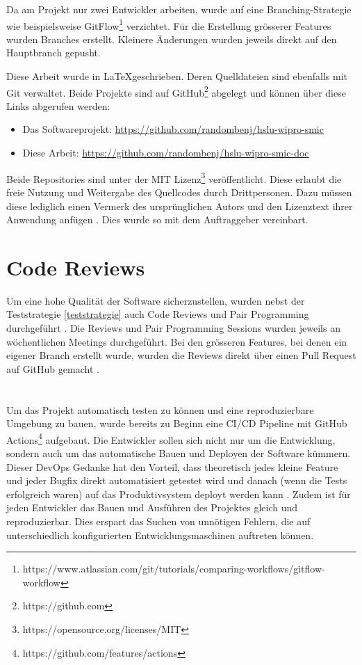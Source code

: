 Da am Projekt nur zwei Entwickler arbeiten,
wurde auf eine Branching-Strategie wie beispielsweise
GitFlow\footnote{https://www.atlassian.com/git/tutorials/comparing-workflows/gitflow-workflow} verzichtet.
Für die Erstellung grösserer Features wurden Branches erstellt.
Kleinere Änderungen wurden jeweils direkt auf den Hauptbranch gepusht.

Diese Arbeit wurde in \LaTeX geschrieben. Deren Quelldateien sind ebenfalls mit Git verwaltet.
Beide Projekte sind auf GitHub\footnote{https://github.com} abgelegt und können über diese Links abgerufen werden:

\begin{itemize}
      \item Das Softwareprojekt: \url{https://github.com/randombenj/hslu-wipro-smic}
      \item Diese Arbeit: \url{https://github.com/randombenj/hslu-wipro-smic-doc}
\end{itemize}

Beide Repositories sind unter der MIT Lizenz\footnote{https://opensource.org/licenses/MIT} veröffentlicht.
Diese erlaubt die freie Nutzung und Weitergabe des Quellcodes durch Drittpersonen.
Dazu müssen diese lediglich einen Vermerk des ursprünglichen Autors und den Lizenztext ihrer Anwendung anfügen \parencite{mit_licence}.
Dies wurde so mit dem Auftraggeber vereinbart.

\section{Code Reviews}

Um eine hohe Qualität der Software sicherzustellen, wurden nebst der Teststrategie \ref{teststrategie}
auch Code Reviews und Pair Programming durchgeführt \parencite{fu2017code}.
Die Reviews und Pair Programming Sessions wurden jeweils an wöchentlichen
Meetings durchgeführt.
Bei den grösseren Features, bei denen ein eigener Branch erstellt wurde, wurden die
Reviews direkt über einen Pull Request auf GitHub gemacht \parencite{github_flow_docs_2021}.

\section{}

Um das Projekt automatisch testen zu können und eine reproduzierbare Umgebung zu bauen,
wurde bereits zu Beginn eine \ac{CI/CD} Pipeline mit GitHub Actions\footnote{https://github.com/features/actions}
aufgebaut.
Die Entwickler sollen sich nicht nur um die Entwicklung, sondern auch um das automatische Bauen und Deployen der
Software kümmern. Dieser DevOps Gedanke hat den Vorteil, dass
theoretisch jedes kleine Feature und jeder Bugfix direkt automatisiert getestet
wird und danach (wenn die Tests erfolgreich waren) auf das Produktivsystem
deployt werden kann \parencite{what_is_devops}.
Zudem ist für jeden Entwickler das Bauen und Ausführen des Projektes gleich und
reproduzierbar. Dies erspart das Suchen von unnötigen Fehlern, die auf unterschiedlich
konfigurierten Entwicklungsmaschinen auftreten können.
